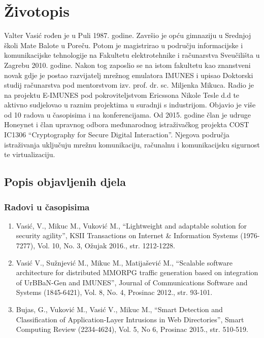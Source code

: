 \renewcommand{\leftmark}{Životopis}
\chapter*{Životopis}

Valter Vasić rođen je u Puli 1987. godine. Završio je opću gimnaziju
u Srednjoj školi Mate Balote u Poreču. Potom je magistrirao u području
informacijske i komunikacijske tehnologije na Fakultetu elektrotehnike i
računarstva Sveučilišta u Zagrebu 2010. godine.
Nakon tog zaposlio se na istom fakultetu kao znanstveni novak gdje je
postao razvijatelj mrežnog emulatora IMUNES i upisao Doktorski studij
računarstva pod mentorstvom izv. prof. dr. sc. Miljenka Mikuca. Radio je na
projektu E-IMUNES pod pokroviteljstvom Ericssona Nikole Tesle d.d te aktivno
sudjelovao u raznim projektima u suradnji s industrijom. Objavio je više od 10
radova u časopisima i na konferencijama. Od 2015. godine član je udruge Honeynet
i član upravnog odbora međunarodnog istraživačkog projekta COST IC1306
``Cryptography for Secure Digital Interaction''.  Njegova područja istraživanja
uključuju mrežnu komunikaciju, računalnu i komunikacijsku sigurnost te
virtualizaciju.

\section*{Popis objavljenih djela}

\subsection*{Radovi u časopisima}

\begin{enumerate}
\item Vasić, V., Mikuc M., Vuković M., ``Lightweight and adaptable solution for
    security agility'', KSII Transactions on Internet \& Information Systems
    (1976-7277), Vol. 10, No. 3, Ožujak 2016., str. 1212-1228.
\item Vasić V., Sužnjević M., Mikuc M., Matijašević M., ``Scalable software
    architecture for distributed MMORPG traffic generation based on integration
    of UrBBaN-Gen and IMUNES'', Journal of Communications Software and Systems
    (1845-6421), Vol. 8, No. 4, Prosinac 2012., str. 93-101.
\item Bujas, G., Vuković M., Vasić V., Mikuc M., ``Smart Detection and
    Classification of Application-Layer Intrusions in Web Directories'', Smart
    Computing Review (2234-4624), Vol. 5, No 6, Prosinac 2015., str. 510-519.
\end{enumerate}

